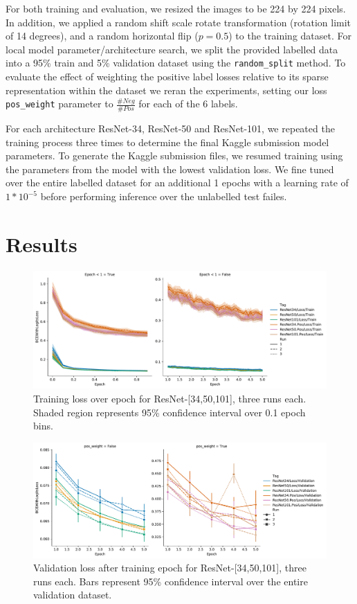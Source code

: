 \documentclass[runningheads]{llncs}
\begin{document}
For both training and evaluation, we resized the images to be 224 by 224 pixels.
In addition, we applied a random shift scale rotate transformation (rotation limit of 14 degrees), and a random horizontal flip ($p=0.5$) to the training dataset.
For local model parameter/architecture search, we split the provided labelled data into a 95\% train and 5\% validation dataset using the \texttt{random\_split} method.
To evaluate the effect of weighting the positive label losses relative to its sparse representation within the dataset we reran the experiments, setting our loss \texttt{pos\_weight} parameter to $\frac{\# Neg}{\# Pos}$ for each of the 6 labels.

For each architecture ResNet-34, ResNet-50 and ResNet-101, we repeated the training process three times to determine the final Kaggle submission model parameters.
To generate the Kaggle submission files, we resumed training using the parameters from the model with the lowest validation loss.
We fine tuned over the entire labelled dataset for an additional 1 epochs with a learning rate of $1*10^{-5}$ before performing inference over the unlabelled test failes.


\section{Results}

\begin{figure}[htbp]
    \centering
    \includegraphics[width=4.8in]{fig/train_loss_epoch}
    \caption{Training loss over epoch for ResNet-[34,50,101], three runs each. Shaded region represents 95\% confidence interval over 0.1 epoch bins.}
    \label{fig:train_loss}
\end{figure}

\begin{figure}[htbp]
    \centering
    \includegraphics[width=4.8in]{fig/val_loss_epoch}
    \caption{Validation loss after training epoch for ResNet-[34,50,101], three runs each. Bars represent 95\% confidence interval over the entire validation dataset.}
    \label{fig:val_loss}
\end{figure}
\end{document}
